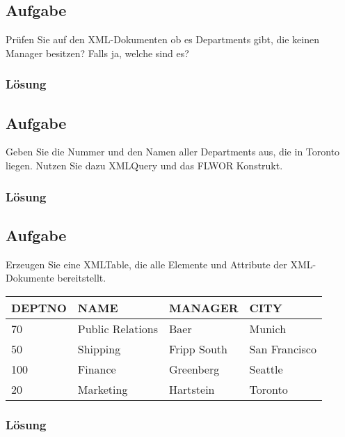 \subsection{Aufgabe}
\label{sec:uebung_11.aufgabe_03}
Prüfen Sie auf den XML-Dokumenten ob es Departments gibt, die keinen Manager besitzen? Falls ja, welche sind es?

\subsubsection*{Lösung}
\label{sec:uebung_11.aufgabe_03.loesung}


\subsection{Aufgabe}
\label{sec:uebung_11.aufgabe_04}
Geben Sie die Nummer und den Namen  aller Departments aus, die in Toronto liegen. Nutzen Sie dazu XMLQuery und das FLWOR Konstrukt.

\subsubsection*{Lösung}
\label{sec:uebung_11.aufgabe_04.loesung}


\subsection{Aufgabe}
\label{sec:uebung_11.aufgabe_05}
Erzeugen Sie eine XMLTable, die alle Elemente und Attribute der XML-Dokumente bereitstellt.

\begin{table}[H]
  \centering
  \ttfamily
  \begin{tabular}{|l|l|l|l|}
    \hline
    \textbf{DEPTNO} & \textbf{NAME}    & \textbf{MANAGER} & \textbf{CITY} \\
    \hline
    70              & Public Relations & Baer             & Munich        \\
    50              & Shipping         & Fripp South      & San Francisco \\
    100             & Finance          & Greenberg        & Seattle       \\
    20              & Marketing        & Hartstein        & Toronto       \\
    \hline
  \end{tabular}
\end{table}

\subsubsection*{Lösung}
\label{sec:uebung_11.aufgabe_05.loesung}
